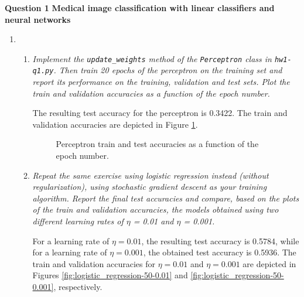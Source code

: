 \documentclass[12pt]{article}
\begin{document}
\center\large{\vskip 0.5cm\textbf{Question 1}}
\center\textbf{Medical image classification with linear classifiers and neural networks}
\begin{enumerate}[leftmargin=\labelsep]

    \item
          \begin{enumerate}[label=\alph*)]

              \item \textit{Implement the \texttt{update\_weights} method of the \texttt{Perceptron} class in \texttt{hw1-q1.py}. Then train 20 epochs of the perceptron on the training set and report its performance on the training, validation and test sets. Plot the train and validation accuracies as a function of the epoch number.}

                    \vspace{12pt}

                    The resulting test accuracy for the perceptron is 0.3422. The train and validation accuracies are depicted in Figure \ref{fig:perceptron-20-1.0}.

                    \begin{figure}[H]
                        \centering
                        
                        \caption{Perceptron train and test accuracies as a function of the epoch number.}
                        \label{fig:perceptron-20-1.0}
                    \end{figure}

                    \vspace{12pt}

              \item \textit{Repeat the same exercise using logistic regression instead (without regularization), using stochastic gradient descent as your training algorithm.  Report the final test accuracies and compare, based on the plots of the train and validation accuracies, the models obtained using two different learning rates of $\eta$ = 0.01 and $\eta$ = 0.001.}

                    \vspace{12pt}

                    For a learning rate of $\eta = 0.01$, the resulting test accuracy is 0.5784, while for a learning rate of $\eta = 0.001$, the obtained test accuracy is 0.5936. The train and validation accuracies for $\eta = 0.01$ and $\eta = 0.001$ are depicted in Figures \ref{fig:logistic_regression-50-0.01} and \ref{fig:logistic_regression-50-0.001}, respectively.


\end{enumerate}
\end{enumerate}
\end{document}
